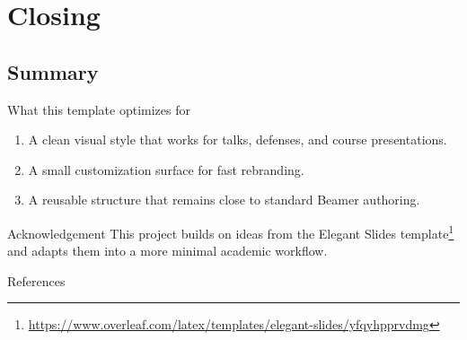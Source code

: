 \documentclass[8pt]{beamer}
\begin{document}
\section{Closing}

\makesection

\subsection{Summary}

\begin{frame}{\insertsection}{\insertsubsection}

    \begin{block}{What this template optimizes for}
        \begin{enumerate}
            \item A clean visual style that works for talks, defenses, and course presentations.
            \item A small customization surface for fast rebranding.
            \item A reusable structure that remains close to standard Beamer authoring.
        \end{enumerate}
    \end{block}

    \begin{block}{Acknowledgement}
        This project builds on ideas from the Elegant Slides template\footnote{\url{https://www.overleaf.com/latex/templates/elegant-slides/yfqyhpprvdmg}} and adapts them into a more minimal academic workflow.
    \end{block}

\end{frame}

\begin{frame}{References}
    \printbibliography
\end{frame}
\end{document}
